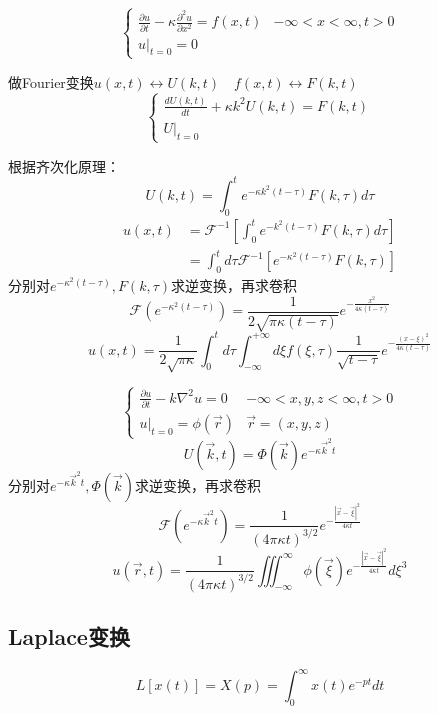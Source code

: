 \begin{ex}[非齐次方程]
    $$\begin{cases}
        \frac{\partial u}{\partial t}-\kappa\frac{\partial^{2}u}{\partial x^{2}}=f(x,t)&-\infty<x<\infty,t>0\\
        u|_{t=0}=0
        \end{cases}$$

做Fourier变换$u(x,t)\longleftrightarrow U(k,t)\quad f(x,t)\longleftrightarrow F(k,t)$
$$\begin{cases}
    \frac{dU(k,t)}{dt}+\kappa k^{2}U(k,t)=F(k,t)\\
    U|_{t=0}\end{cases}$$

    根据齐次化原理：
$$U(k,t)=\int_{0}^{t}e^{-\kappa k^{2}(t-\tau)}F(k,\tau)d\tau$$
$$\begin{aligned}
    u(x,t)&=\mathscr{F}^{-1}\left[\int_{0}^{t}e^{-k^{2}(t-\tau)}F(k,\tau)d\tau\right]\\
    &=\int_{0}^{t}d\tau\mathscr{F}^{-1}\left[e^{-\kappa ^{2}(t-\tau)}F(k,\tau)\right]
\end{aligned}$$
分别对$e^{-\kappa ^{2}(t-\tau)},F(k,\tau)$求逆变换，再求卷积
$$\mathscr{F}(e^{-\kappa ^{2}(t-\tau)})=\frac{1}{2\sqrt{\pi \kappa(t-\tau)}}e^{-\frac{x^{2}}{4\kappa(t-\tau)}}$$
$$u(x,t)=\frac{1}{2\sqrt{\pi\kappa}}\int_{0}^{t}d\tau\int_{-\infty}^{+\infty}d\xi f(\xi,\tau)\frac{1}{\sqrt{t-\tau}}e^{-\frac{(x-\xi)^{2}}{4\kappa(t-\tau)}}$$
\end{ex}

\begin{ex}[三维齐次热传导问题]
    $$\begin{cases}
        \frac{\partial u}{\partial t}-k\nabla^2u=0&-\infty<x,y,z<\infty,t>0\\
        u|_{t=0}=\phi(\vec{r})&\vec{r}=(x,y,z)
    \end{cases}$$
    $$U(\vec{k},t)=\Phi(\vec{k})e^{-\kappa\vec{k}^{2}t}$$
分别对$e^{-\kappa\vec{k}^{2}t},\Phi(\vec{k})$求逆变换，再求卷积
$$\mathscr{F}(e^{-\kappa\vec{k}^{2}t})=\frac{1}{(4\pi \kappa t)^{3/2}}e^{-\frac{|\vec{x}-\vec{\xi}|^{2}}{4\kappa t}}$$
$$u(\vec{r},t)=\frac{1}{(4\pi \kappa t)^{3/2}}\iiint_{-\infty}^{\infty}\phi(\vec{\xi})e^{-\frac{|\vec{x}-\vec{\xi}|^{2}}{4\kappa t}}d\xi^{3}$$
\end{ex}


\newpage
\subsection{Laplace变换}
\begin{dfn}[Laplace变换]
    $$L[x(t)]=X(p)=\int_0^{\infty}{x(t)e^{-pt}dt }$$
\end{dfn}

